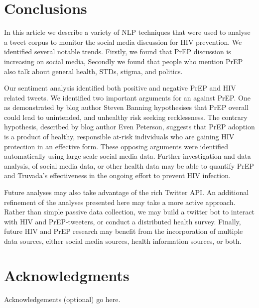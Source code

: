 \documentclass{sig-alternate-05-2015}
\begin{document}
\section{Conclusions}

In this article we describe a variety of NLP techniques that were used to analyse a tweet corpus to monitor the social media discussion for HIV prevention. We identified several notable trends. Firstly, we found that PrEP discussion is increasing on social media, Secondly we found that people who mention PrEP also talk about general health, STDs, stigma, and politics.

Our sentiment analysis identified both positive and negative PrEP and HIV related tweets. We identified two important arguments for an against PrEP. One as demonstrated by blog author Steven Banning hypothesises that PrEP overall could lead to unintended, and unhealthy risk seeking recklessness. The contrary hypothesis, described by blog author Even Peterson, suggests that PrEP adoption is a product of healthy, responsible at-risk individuals who are gaining HIV protection in an effective form. These opposing arguments were identified automatically using large scale social media data. Further investigation and data analysis, of social media data, or other health data may be able to quantify PrEP and Truvada's effectiveness in the ongoing effort to prevent HIV infection.

Future analyses may also take advantage of the rich Twitter API. An additional refinement of the analyses presented here may take a more active approach. Rather than simple passive data collection, we may build a twitter bot to interact with HIV and PrEP-tweeters, or conduct a distributed health survey. Finally, future HIV and PrEP research may benefit from the incorporation of multiple data sources, either social media sources, health information sources, or both.


\section{Acknowledgments}

Acknowledgements (optional) go here.

%

%
%





\end{document}
